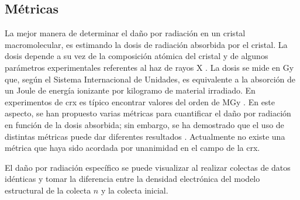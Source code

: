 \subsection{Métricas}
La mejor manera de determinar el daño por radiación en un cristal macromolecular, es estimando la dosis de radiación absorbida por el cristal. La dosis depende a su vez de la composición atómica del cristal y de algunos parámetros experimentales referentes al haz de rayos X . La dosis se mide en \si{\gray} que, según el Sistema Internacional de Unidades, es equivalente a la absorción de un Joule de energía ionizante por kilogramo de material irradiado. En experimentos de \acrshort{crx} es típico encontrar valores del orden de \si{\mega\gray} . En este aspecto, se han propuesto varias métricas para cuantificar el daño por radiación en función de la dosis absorbida; sin embargo, se ha demostrado que el uso de distintas métricas puede dar diferentes resultados . Actualmente no existe una métrica que haya sido acordada por unanimidad en el campo de la \acrshort{crx}. 

El daño por radiación específico se puede visualizar al realizar colectas de datos idénticas y tomar la diferencia entre la densidad electrónica del modelo estructural de la colecta $n$ y la colecta inicial.


